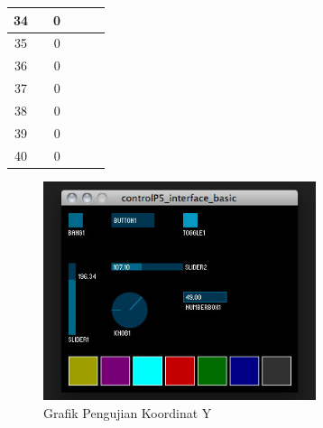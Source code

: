 \begin{table}[]
\begin{tabular}{|c|c|c|c|c|c|}
 		34                                           &                                  & 0                                &                                  &                                  &                                                     \\ \hline
 		35                                           &                                  & 0                                &                                  &                                  &                                                     \\ \hline
 		36                                           &                                  & 0                                &                                  &                                  &                                                     \\ \hline
 		37                                           &                                  & 0                                &                                  &                                  &                                                     \\ \hline
 		38                                           &                                  & 0                                &                                  &                                  &                                                     \\ \hline
 		39                                           &                                  & 0                                &                                  &                                  &                                                     \\ \hline
 		40                                           &                                  & 0                                &                                  &                                  &                                                     \\ \hline
 	\end{tabular}
 	
 \end{table} 
 \begin{figure}[H]
 	\centering
 	\includegraphics[width=8cm]{gambar/controlp5.jpg}
 	\caption{Grafik Pengujian Koordinat Y}
 	\label{pic.koordinaty}
 \end{figure}



